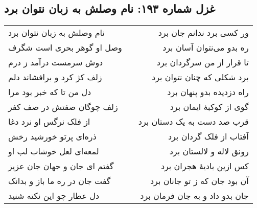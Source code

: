 \begin{center}
\section*{غزل شماره ۱۹۳: نام وصلش به زبان نتوان برد}
\label{sec:193}
\begin{longtable}{l p{0.5cm} r}
نام وصلش به زبان نتوان برد
&&
ور کسی برد ندانم جان برد
\\
وصل او گوهر بحری است شگرف
&&
ره بدو می‌نتوان آسان برد
\\
دوش سرمست درآمد ز درم
&&
تا قرار از من سرگردان برد
\\
زلف کژ کرد و برافشاند دلم
&&
برد شکلی که چنان نتوان برد
\\
دل من تا که خبر بود مرا
&&
راه دزدیده بدو پنهان برد
\\
زلف چوگان صفتش در صف کفر
&&
گوی از کوکبهٔ ایمان برد
\\
از فلک نرگس او نرد دغا
&&
قرب صد دست به یک دستان برد
\\
ذره‌ای پرتو خورشید رخش
&&
آفتاب از فلک گردان برد
\\
لمعه‌ای لعل خوشاب لب او
&&
رونق لاله و لالستان برد
\\
گفتم ای جان و جهان جان عزیز
&&
کس ازین بادیهٔ هجران برد
\\
گفت جان در ره ما باز و بدانک
&&
آن بود جان که ز تو جانان برد
\\
دل عطار چو این نکته شنید
&&
جان بدو داد و به جان فرمان برد
\\
\end{longtable}
\end{center}
